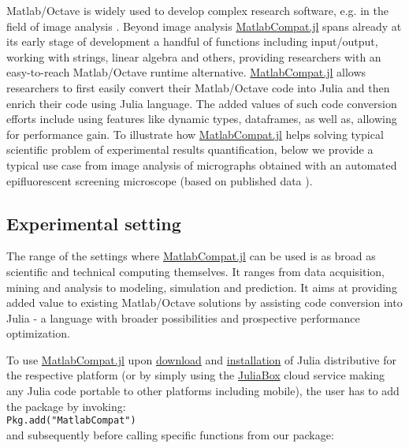 Matlab/Octave is widely used to develop complex research software, e.g. in the field of image analysis \cite{Kiss_2014, 17076895}. Beyond image analysis \href{https://github.com/MatlabCompat/MatlabCompat.jl}{MatlabCompat.jl} spans already at its early stage of development a handful of functions including input/output, working with strings, linear algebra and others, providing researchers with an easy-to-reach Matlab/Octave runtime alternative. \href{https://github.com/MatlabCompat/MatlabCompat.jl}{MatlabCompat.jl} allows researchers to first easily convert their Matlab/Octave code into Julia and then enrich their code using Julia language. The added values of such code conversion efforts include using features like dynamic types, dataframes, as well as, allowing for performance gain. To illustrate how \href{https://github.com/MatlabCompat/MatlabCompat.jl}{MatlabCompat.jl} helps solving typical scientific problem of experimental results quantification, below we provide a typical use case from image analysis of micrographs obtained with an automated epifluorescent screening microscope (based on published data \cite{22787215}).

\subsection{Experimental setting}

The range of the settings where \href{https://github.com/MatlabCompat/MatlabCompat.jl}{MatlabCompat.jl} can be used is as broad as scientific and technical computing themselves. It ranges from data acquisition, mining and analysis to modeling, simulation and prediction. It aims at providing added value to existing Matlab/Octave solutions by assisting code conversion into Julia - a language with broader possibilities and prospective performance optimization.

To use \href{https://github.com/MatlabCompat/MatlabCompat.jl}{MatlabCompat.jl} upon \href{http://julialang.org/downloads/}{download} and \href{http://docs.julialang.org/en/release-0.3/manual/getting-started/}{installation} of Julia distributive for the respective platform (or by simply using the \href{https://www.juliabox.org/}{JuliaBox} cloud service making any Julia code portable to other platforms including mobile), the user has to add the package by invoking:\\

\verb|Pkg.add("MatlabCompat")|\\

and subsequently before calling specific functions from our package:\\

